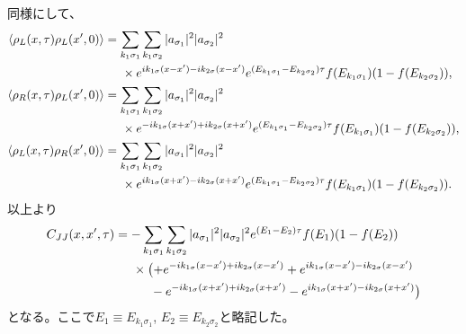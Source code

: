\documentclass[10pt,a4j]{jarticle}
\begin{document}
同様にして、
\begin{align}
\langle \rho_L(x,\tau) \rho_L(x^\prime,0) \rangle
&=  \sum_{k_1\sigma_1} \sum_{k_1\sigma_2} |a_{\sigma_1}|^2  |a_{\sigma_2}|^2
\nonumber \\ & \hspace{5mm} \times  e^{ik_{1\sigma}(x-x^\prime)-ik_{2\sigma}(x-x^\prime)}
e^{(E_{k_1\sigma_1}-E_{k_2\sigma_2})\tau} f(E_{k_1\sigma_1}) (1-f(E_{k_2\sigma_2})), \\
\langle \rho_R(x,\tau) \rho_L(x^\prime,0) \rangle
&=  \sum_{k_1\sigma_1} \sum_{k_1\sigma_2} |a_{\sigma_1}|^2  |a_{\sigma_2}|^2
\nonumber \\ & \hspace{5mm} \times  e^{-ik_{1\sigma}(x+x^\prime)+ik_{2\sigma}(x+x^\prime)}
e^{(E_{k_1\sigma_1}-E_{k_2\sigma_2})\tau} f(E_{k_1\sigma_1}) (1-f(E_{k_2\sigma_2})), \\
\langle \rho_L(x,\tau) \rho_R(x^\prime,0) \rangle
&=  \sum_{k_1\sigma_1} \sum_{k_1\sigma_2} |a_{\sigma_1}|^2  |a_{\sigma_2}|^2
\nonumber \\ & \hspace{5mm} \times  e^{ik_{1\sigma}(x+x^\prime)-ik_{2\sigma}(x+x^\prime)}
e^{(E_{k_1\sigma_1}-E_{k_2\sigma_2})\tau} f(E_{k_1\sigma_1}) (1-f(E_{k_2\sigma_2})).
\end{align}
以上より
\begin{align}
C_{JJ}(x,x^\prime,\tau) &= -  \sum_{k_1\sigma_1} \sum_{k_1\sigma_2} |a_{\sigma_1}|^2  |a_{\sigma_2}|^2
e^{(E_1-E_2)\tau} f(E_1) (1-f(E_2)) \nonumber \\
& \hspace{5mm} \times \bigl( +e^{-ik_{1\sigma}(x-x^\prime)+ik_{2\sigma}(x-x^\prime)}
+e^{ik_{1\sigma}(x-x^\prime)-ik_{2\sigma}(x-x^\prime)} \\
& \hspace{10mm} -e^{-ik_{1\sigma}(x+x^\prime)+ik_{2\sigma}(x+x^\prime)}
- e^{ik_{1\sigma}(x+x^\prime)-ik_{2\sigma}(x+x^\prime)}\bigr)
\end{align}
となる。ここで$E_1 \equiv E_{k_1\sigma_1}$, $E_2 \equiv E_{k_2\sigma_2}$と略記した。
\end{document}
